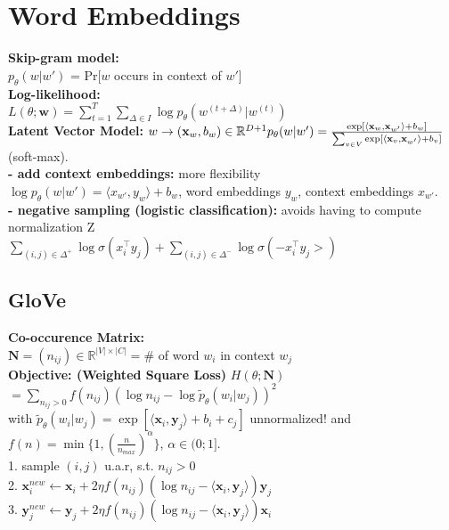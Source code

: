 \section{Word Embeddings}
\textbf{Skip-gram model:}\\
$p_\theta(w|w')$ = Pr[$w$ occurs in context of $w'$]\\
\textbf{Log-likelihood:}\\
$L(\theta; \mathbf{w}) = \sum_{t=1}^T\sum_{\Delta \in I}{\log p_\theta(w^{(t+\Delta)}|w^{(t)})}$\\
\textbf{Latent Vector Model:} $w \rightarrow (\mathbf{x}_w, b_w) \in \mathbb{R}^{D+1} \\p_{\theta}(w|w') = \frac{\exp[\langle \mathbf{x}_w,\mathbf{x}_{w'}\rangle + b_w]}{\sum_{v\in V}{\exp[\langle \mathbf{x}_v,\mathbf{x}_{w'}\rangle + b_v ]}}$ (soft-max).\\
\textbf{- add context embeddings:} more flexibility\\
$\log p_{\theta}(w|w') = \langle x_{w'}, y_{w} \rangle + b_w$,  word embeddings $y_w$, context embeddings $x_{w'}$.\\
\textbf{- negative sampling (logistic classification):} avoids having to compute normalization Z \\
$\sum_{(i,j) \in \Delta^+}\log\sigma(x_i^\top y_j) + \sum_{(i,j) \in \Delta^-}\log\sigma(-x_i^\top y_j>)$

\subsection*{GloVe}
\textbf{Co-occurence Matrix:}\\
$\mathbf{N} = (n_{ij}) \in \mathbb{R}^{|V|\times|C|} = \#$ of word $w_i$ in context $w_j$\\
\textbf{Objective: (Weighted Square Loss)} $H(\theta;\mathbf{N})$\\
$= \sum_{n_{ij} > 0} f(n_{ij})(\log n_{ij} - \log \tilde{p}_\theta(w_i|w_j))^2$\\
with $\tilde{p}_\theta(w_i|w_j) = \exp[\langle \mathbf{x}_i, \mathbf{y}_j \rangle + b_i + c_j]$ unnormalized! and $f(n) = \min\{1, (\frac{n}{n_{max}})^\alpha\}$, $\alpha \in (0;1]$.\\
1. sample $(i,j)$ u.a.r, s.t. $n_{ij}>0$\\
2. $\mathbf{x}_i^{new} \leftarrow \mathbf{x}_i + 2\eta f(n_{ij})(\log n_{ij} - \langle \mathbf{x}_i, \mathbf{y}_j \rangle)\mathbf{y}_j$\\
3. $\mathbf{y}_j^{new} \leftarrow \mathbf{y}_j + 2\eta f(n_{ij})(\log n_{ij} - \langle \mathbf{x}_i, \mathbf{y}_j \rangle)\mathbf{x}_i$

